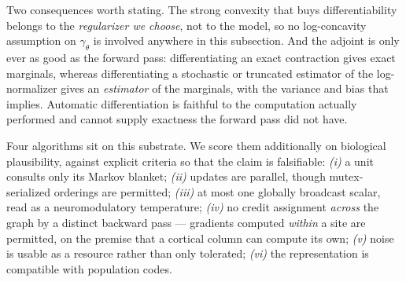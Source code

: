 Two consequences worth stating. The strong convexity that buys differentiability belongs to the \emph{regularizer we choose}, not to the model, so no log-concavity assumption on $\gamma_\theta$ is involved anywhere in this subsection. And the adjoint is only ever as good as the forward pass: differentiating an exact contraction gives exact marginals, whereas differentiating a stochastic or truncated estimator of the log-normalizer gives an \emph{estimator} of the marginals, with the variance and bias that implies. Automatic differentiation is faithful to the computation actually performed and cannot supply exactness the forward pass did not have.

Four algorithms sit on this substrate. We score them additionally on biological plausibility, against explicit criteria so that the claim is falsifiable: \emph{(i)} a unit consults only its Markov blanket; \emph{(ii)} updates are parallel, though mutex-serialized orderings are permitted; \emph{(iii)} at most one globally broadcast scalar, read as a neuromodulatory temperature; \emph{(iv)} no credit assignment \emph{across} the graph by a distinct backward pass --- gradients computed \emph{within} a site are permitted, on the premise that a cortical column can compute its own; \emph{(v)} noise is usable as a resource rather than only tolerated; \emph{(vi)} the representation is compatible with population codes.

